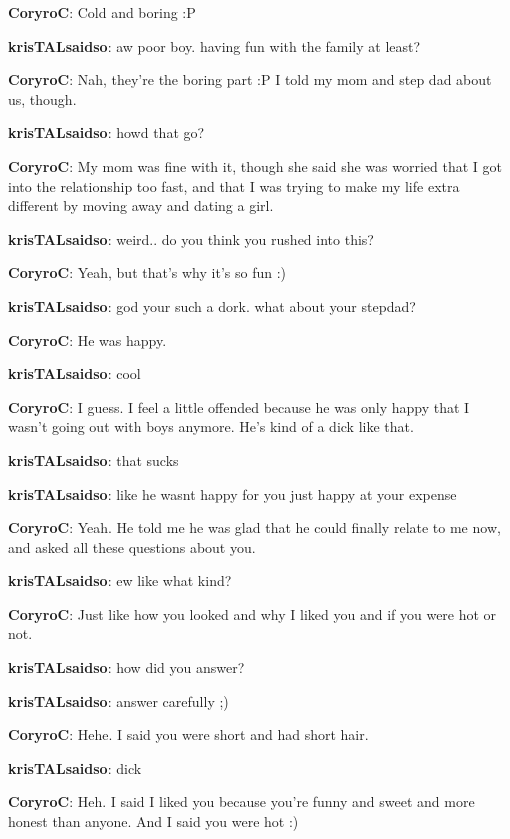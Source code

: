 \textbf{\color{blue}CoryroC}: Cold and boring :P

\textbf{\color{red}krisTALsaidso}: aw poor boy. having fun with the family at least?

\textbf{\color{blue}CoryroC}: Nah, they're the boring part :P  I told my mom and step dad about us, though.

\textbf{\color{red}krisTALsaidso}: howd that go?

\textbf{\color{blue}CoryroC}: My mom was fine with it, though she said she was worried that I got into the relationship too fast, and that I was trying to make my life extra different by moving away and dating a girl.

\textbf{\color{red}krisTALsaidso}: weird.. do you think you rushed into this?

\textbf{\color{blue}CoryroC}: Yeah, but that's why it's so fun :)

\textbf{\color{red}krisTALsaidso}: god your such a dork.  what about your stepdad?

\textbf{\color{blue}CoryroC}: He was happy.

\textbf{\color{red}krisTALsaidso}: cool

\textbf{\color{blue}CoryroC}: I guess.  I feel a little offended because he was only happy that I wasn't going out with boys anymore.  He's kind of a dick like that.

\textbf{\color{red}krisTALsaidso}: that sucks

\textbf{\color{red}krisTALsaidso}: like he wasnt happy for you just happy at your expense

\textbf{\color{blue}CoryroC}: Yeah.  He told me he was glad that he could finally relate to me now, and asked all these questions about you.

\textbf{\color{red}krisTALsaidso}: ew like what kind?

\textbf{\color{blue}CoryroC}: Just like how you looked and why I liked you and if you were hot or not.

\textbf{\color{red}krisTALsaidso}: how did you answer?

\textbf{\color{red}krisTALsaidso}: answer carefully ;)

\textbf{\color{blue}CoryroC}: Hehe.  I said you were short and had short hair.

\textbf{\color{red}krisTALsaidso}: dick

\textbf{\color{blue}CoryroC}: Heh.  I said I liked you because you're funny and sweet and more honest than anyone.  And I said you were hot :)

